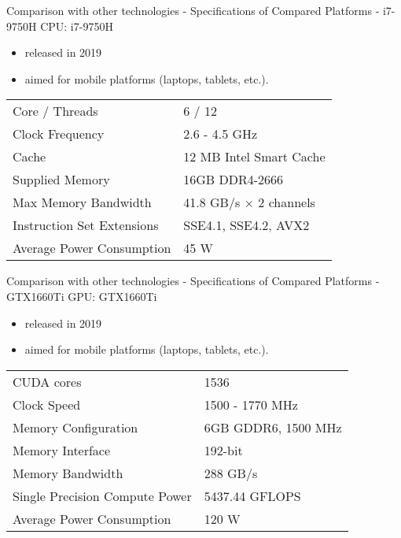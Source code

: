 \begin{frame}{Comparison with other technologies - Specifications of Compared Platforms - i7-9750H}
    CPU: i7-9750H\\
    \begin{itemize}
        \item released in 2019
        \item aimed for mobile platforms (laptops, tablets, etc.).
    \end{itemize}
    \begin{table}[H]
        \center
        \begin{tabular}
            { l | l }
            Core / Threads & 6 / 12\\
            Clock Frequency & 2.6 - 4.5 GHz\\
            Cache & 12 MB Intel Smart Cache\\
            Supplied Memory & 16GB DDR4-2666\\
            Max Memory Bandwidth & 41.8 GB/s $\times$ 2 channels\\
            Instruction Set Extensions & SSE4.1, SSE4.2, AVX2\\
            Average Power Consumption & 45 W\\
        \end{tabular}
    \end{table}
\end{frame}

\begin{frame}{Comparison with other technologies - Specifications of Compared Platforms - GTX1660Ti}
    GPU: GTX1660Ti\\
    \begin{itemize}
        \item released in 2019
        \item aimed for mobile platforms (laptops, tablets, etc.).
    \end{itemize}
    \begin{table}[H]
        \center
        \begin{tabular}
            { l | l }
            CUDA cores & 1536\\
            Clock Speed & 1500 - 1770 MHz\\
            Memory Configuration & 6GB GDDR6, 1500 MHz\\
            Memory Interface & 192-bit\\
            Memory Bandwidth & 288 GB/s\\
            Single Precision Compute Power & 5437.44 GFLOPS\\
            Average Power Consumption & 120 W\\
        \end{tabular}
    \end{table}
\end{frame}

